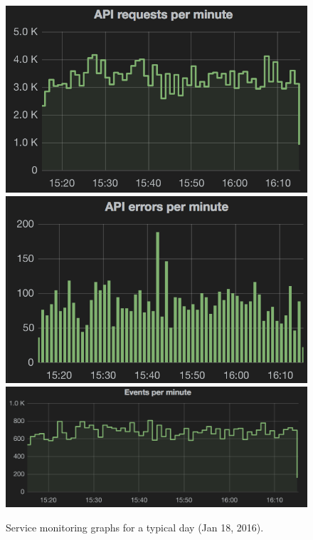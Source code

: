 \documentclass{sig-alternate}
\begin{document}
\begin{figure}
  \begin{center}
    \includegraphics[scale=0.332]{api-requests}
    \includegraphics[scale=0.332]{api-errors}
    \includegraphics[scale=0.438]{events-per-min}
  \end{center}
  \caption{Service monitoring graphs for a typical day (Jan 18,
  2016).}
  \label{fig:service-stats}
\end{figure}
\end{document}
